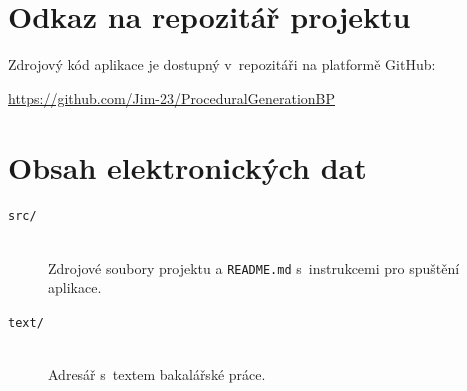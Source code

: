 \documentclass[
   program=itk,
   biblatex,
   figures=true,
   tables=true,
   glossaries,
   index
]{kidiplom}
\begin{document}
\appendix

\section{Odkaz na repozitář projektu}

Zdrojový kód aplikace je dostupný v~repozitáři na platformě GitHub:

\begin{center}
\url{https://github.com/Jim-23/ProceduralGenerationBP}
\end{center}

\section{Obsah elektronických dat} \label{sec:ObsahData}

\begin{description}

\item[\texttt{src/}] \hfill \\
  Zdrojové soubory projektu a
  \texttt{README.md} s~instrukcemi pro spuštění aplikace.

\item[\texttt{text/}] \hfill \\
  Adresář s~textem bakalářské práce.

\end{description}


\glsaddall
\printglossary


\printbibliography

%
%

\end{document}
